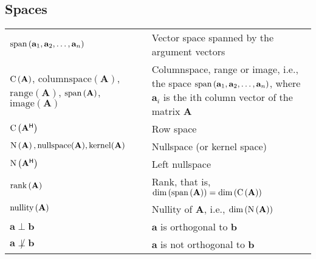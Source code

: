 \documentclass{article}
\renewcommand{\dim}[1]{\ensuremath{\textnormal{dim}\left(#1\right)}} %
\newcommand{\nullspace}[1]{\ensuremath{\textnormal{N}\left(#1\right)}} %
\newcommand{\nullity}[1]{\ensuremath{\textnormal{nullity}\left(#1\right)}} %
\renewcommand{\span}[1]{\ensuremath{\textnormal{span}\left(#1\right)}} %
\newcommand{\range}[1]{\ensuremath{\textnormal{C}\left(#1\right)}} %
\newcommand{\rank}[1]{\ensuremath{\textnormal{rank}\left(#1\right)}} %
\begin{document}
\subsection{Spaces}
\begin{xltabular}{\textwidth}{XX}
    \(\span{\mathbf{a}_1, \mathbf{a}_2, \dots, \mathbf{a}_n}\) & Vector space spanned by the argument vectors\\
    \(\range{\mathbf{A}}\), \(\mathrm{columnspace}(\mathbf{A})\), \(\mathrm{range}(\mathbf{A})\), \(\span{\mathbf{A}}\), \(\mathrm{image}(\mathbf{A})\) & Columnspace, range or image, i.e., the space \(\span{\mathbf{a}_1,\mathbf{a}_2, \dots, \mathbf{a}_n}\), where \(\mathbf{a}_i\) is the ith column vector of the matrix \(\mathbf{A}\)\\
    \(\range{\mathbf{A}^\mathsf{H}}\) & Row space\\
    \(\nullspace{\mathbf{A}}, \mathrm{nullspace}(\mathbf{A}), \mathrm{kernel}(\mathbf{A})\) & Nullspace (or kernel space)\\
    \(\nullspace{\mathbf{A^\mathsf{H}}}\) & Left nullspace\\
    \(\rank{\mathbf{A}}\) & Rank, that is, \(\dim{\span{\mathbf{A}}} = \dim{\range{\mathbf{A}}}\)\\
    \(\nullity{\mathbf{A}}\) & Nullity of \(\mathbf{A}\), i.e., \(\dim{\nullspace{\mathbf{A}}}\)\\
    \(\mathbf{a} \perp \mathbf{b}\) & \(\mathbf{a}\) is orthogonal to \(\mathbf{b}\)\\
    \(\mathbf{a} \not\perp \mathbf{b}\) & \(\mathbf{a}\) is not orthogonal to \(\mathbf{b}\)\\
\end{xltabular}
\end{document}
